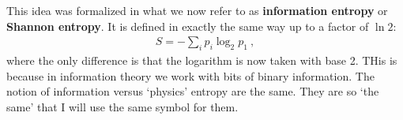 This idea was formalized in what we now refer to as \textbf{information entropy} or \textbf{Shannon entropy}. It is defined in exactly the same way up to a factor of $\ln 2$:
\begin{align}
  S = -\sum_i p_i \log_2 p_1 \ ,
\end{align}
where the only difference is that the logarithm is now taken with base 2. THis is because in information theory we work with bits of binary information. The notion of information versus `physics' entropy are the same. They are so `the same' that I will use the same symbol for them. 


